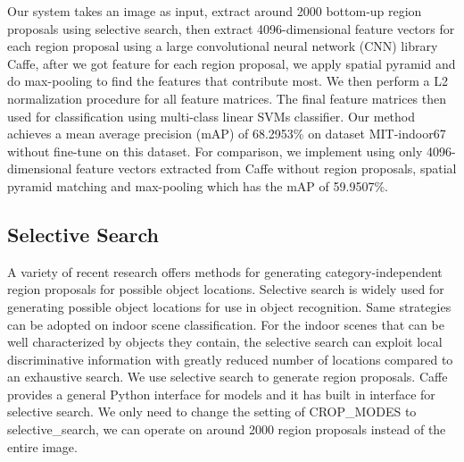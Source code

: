 
Our system takes an image as input, extract around 2000 bottom-up region
proposals using selective search\cite{Uijlings:2013:SSO}, then extract
4096-dimensional feature vectors for each region proposal using a large
convolutional neural network (CNN) library Caffe\cite{Jia:2014:Caffe},
after we got feature for each region proposal, we apply spatial pyramid and
do max-pooling to find the features that contribute most. We then perform a
L2 normalization procedure for all feature matrices. The final feature matrices
then used for classification using multi-class linear SVMs classifier. Our
method achieves a mean average precision (mAP) of 68.2953\% on dataset
MIT-indoor67\cite{Quattoni:2009:RIS} without fine-tune on this dataset.
For comparison, we implement using only 4096-dimensional feature vectors
extracted from Caffe without region proposals, spatial pyramid matching 
and max-pooling which has the mAP of 59.9507\%.

\subsection{Selective Search}
A variety of recent research offers methods for generating category-independent
region proposals for possible object locations.
Selective search is widely used for generating possible object locations for
use in object recognition\cite{Uijlings:2013:SSO}. Same strategies can be
adopted on indoor scene classification. For the indoor scenes that can be well
characterized by objects they contain, the selective search can exploit local
discriminative information with greatly reduced number of locations compared
to an exhaustive search. We use selective search to generate region proposals.
Caffe provides a general Python interface for models and it has built in
interface for selective search. We only need to change the setting of CROP\_MODES
to selective\_search, we can operate on around 2000 region proposals instead of
the entire image.

